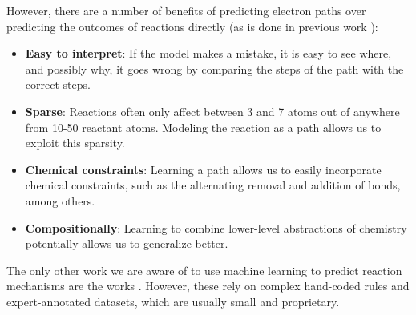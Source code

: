 However, there are a number of benefits of predicting electron paths over predicting the outcomes of reactions directly (as is done in previous work \cite{jin2017predicting,schwaller2017found}):
\begin{itemize}
\item \textbf{Easy to interpret}: If the model makes a mistake, it is easy to see where, and possibly why, it goes wrong by comparing the steps of the path with the correct steps.
\item \textbf{Sparse}: Reactions often only affect between 3 and 7 atoms out of anywhere from 10-50 reactant atoms. Modeling the reaction as a path allows us to exploit this sparsity.
\item \textbf{Chemical constraints}: Learning a path allows us to easily incorporate chemical constraints, such as the alternating removal and addition of bonds, among others.
\item \textbf{Compositionally}: Learning to combine lower-level abstractions of chemistry potentially allows us to generalize better.
\end{itemize}
The only other work we are aware of to use machine learning to predict reaction mechanisms are the works \cite{kayala2011learning,kayala2012reactionpredictor}. However,
these rely on complex hand-coded rules and expert-annotated datasets, which are usually small and proprietary.

